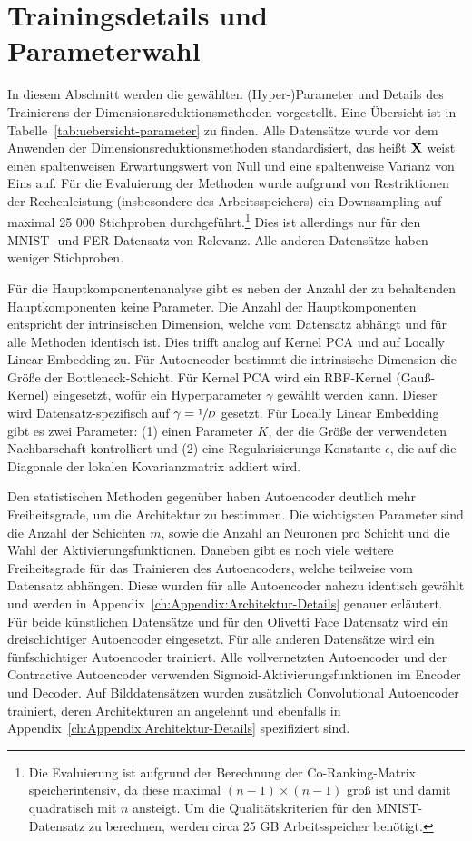 \section{Trainingsdetails und Parameterwahl}
\label{ch:Vergleich:sec:ParameterwahlTrainingsdetails}

In diesem Abschnitt werden die gewählten (Hyper-)Parameter und Details des Trainierens der
Dimensionsreduktionsmethoden vorgestellt. Eine Übersicht ist in
Tabelle~\ref{tab:uebersicht-parameter} zu finden. Alle Datensätze wurde vor dem Anwenden der
Dimensionsreduktionsmethoden standardisiert, das heißt $\mathbf{X}$ weist einen spaltenweisen
Erwartungswert von Null und eine spaltenweise Varianz von Eins auf. Für die Evaluierung der
Methoden wurde aufgrund von Restriktionen der Rechenleistung (insbesondere des Arbeitsspeichers)
ein Downsampling auf maximal 25 000 Stichproben durchgeführt.\footnote{Die Evaluierung ist aufgrund
	der Berechnung der Co-Ranking-Matrix speicherintensiv, da diese maximal $(n-1) \times (n-1)$ groß
	ist und damit quadratisch mit $n$ ansteigt. Um die Qualitätskriterien für den MNIST-Datensatz zu
	berechnen, werden circa 25 GB Arbeitsspeicher benötigt.} Dies ist allerdings nur für den MNIST- und
FER-Datensatz von Relevanz. Alle anderen Datensätze haben weniger Stichproben.

Für die Hauptkomponentenanalyse gibt es neben der Anzahl der zu behaltenden Hauptkomponenten keine
Parameter. Die Anzahl der Hauptkomponenten entspricht der intrinsischen Dimension, welche vom
Datensatz abhängt und für alle Methoden identisch ist. Dies trifft analog auf Kernel PCA und auf
Locally Linear Embedding zu. Für Autoencoder bestimmt die intrinsische Dimension die Größe der
Bottleneck-Schicht. Für Kernel PCA wird ein RBF-Kernel (Gauß-Kernel) eingesetzt, wofür ein
Hyperparameter $\gamma$ gewählt werden kann. Dieser wird Datensatz-spezifisch auf $\gamma =
	\sfrac{1}{D}$ gesetzt. Für Locally Linear Embedding gibt es zwei Parameter: (1) einen Parameter
$K$, der die Größe der verwendeten Nachbarschaft kontrolliert und (2) eine
Regularisierungs-Konstante $\epsilon$, die auf die Diagonale der lokalen Kovarianzmatrix addiert
wird.

Den statistischen Methoden gegenüber haben Autoencoder deutlich mehr Freiheitsgrade, um die
Architektur zu bestimmen. Die wichtigsten Parameter sind die Anzahl der Schichten $m$, sowie die
Anzahl an Neuronen pro Schicht und die Wahl der Aktivierungsfunktionen. Daneben gibt es noch viele
weitere Freiheitsgrade für das Trainieren des Autoencoders, welche teilweise vom Datensatz
abhängen. Diese wurden für alle Autoencoder nahezu identisch gewählt und werden in
Appendix~\ref{ch:Appendix:Architektur-Details} genauer erläutert. Für beide künstlichen Datensätze
und für den Olivetti Face Datensatz wird ein dreischichtiger Autoencoder eingesetzt. Für alle
anderen Datensätze wird ein fünfschichtiger Autoencoder trainiert. Alle vollvernetzten Autoencoder
und der Contractive Autoencoder verwenden Sigmoid-Aktivierungsfunktionen im Encoder und Decoder.
Auf Bilddatensätzen wurden zusätzlich Convolutional Autoencoder trainiert, deren Architekturen an
\textcite[14]{Ghosh.2019} angelehnt und ebenfalls in Appendix~\ref{ch:Appendix:Architektur-Details}
spezifiziert sind.

